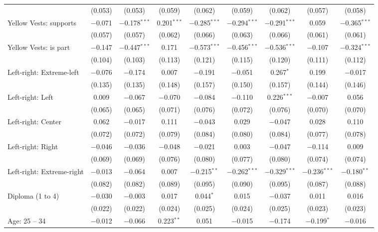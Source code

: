 \documentclass[11pt]{article}
\begin{document}
\begin{table}[!htbp]
{\begin{tabular}{@{\extracolsep{5pt}}lcccccccc}
  & (0.053) & (0.053) & (0.059) & (0.062) & (0.059) & (0.062) & (0.057) & (0.058) \\ 
  Yellow Vests: supports & $-$0.071 & $-$0.178$^{***}$ & 0.201$^{***}$ & $-$0.285$^{***}$ & $-$0.294$^{***}$ & $-$0.291$^{***}$ & 0.059 & $-$0.365$^{***}$ \\ 
  & (0.057) & (0.057) & (0.062) & (0.066) & (0.063) & (0.066) & (0.061) & (0.061) \\ 
  Yellow Vests: is part & $-$0.147 & $-$0.447$^{***}$ & 0.171 & $-$0.573$^{***}$ & $-$0.456$^{***}$ & $-$0.536$^{***}$ & $-$0.107 & $-$0.324$^{***}$ \\ 
  & (0.104) & (0.103) & (0.113) & (0.121) & (0.115) & (0.120) & (0.111) & (0.112) \\ 
  Left-right: Extreme-left & $-$0.076 & $-$0.174 & 0.007 & $-$0.191 & $-$0.051 & 0.267$^{*}$ & 0.199 & $-$0.017 \\ 
  & (0.135) & (0.135) & (0.148) & (0.157) & (0.150) & (0.157) & (0.144) & (0.146) \\ 
  Left-right: Left & 0.009 & $-$0.067 & $-$0.070 & $-$0.084 & $-$0.110 & 0.226$^{***}$ & $-$0.007 & 0.056 \\ 
  & (0.065) & (0.065) & (0.071) & (0.076) & (0.072) & (0.076) & (0.070) & (0.070) \\ 
  Left-right: Center & 0.062 & $-$0.017 & 0.111 & $-$0.043 & 0.029 & $-$0.047 & 0.028 & 0.110 \\ 
  & (0.072) & (0.072) & (0.079) & (0.084) & (0.080) & (0.084) & (0.077) & (0.078) \\ 
  Left-right: Right & $-$0.046 & $-$0.036 & $-$0.048 & $-$0.021 & 0.003 & $-$0.047 & $-$0.114 & 0.009 \\ 
  & (0.069) & (0.069) & (0.076) & (0.080) & (0.077) & (0.080) & (0.074) & (0.074) \\ 
  Left-right: Extreme-right & $-$0.013 & $-$0.064 & 0.007 & $-$0.215$^{**}$ & $-$0.262$^{***}$ & $-$0.329$^{***}$ & $-$0.236$^{***}$ & $-$0.180$^{**}$ \\ 
  & (0.082) & (0.082) & (0.089) & (0.095) & (0.090) & (0.095) & (0.087) & (0.088) \\ 
  Diploma (1 to 4) & $-$0.030 & $-$0.003 & 0.017 & 0.044$^{*}$ & 0.015 & $-$0.037 & 0.011 & 0.016 \\ 
  & (0.022) & (0.022) & (0.024) & (0.025) & (0.024) & (0.025) & (0.023) & (0.023) \\ 
  Age: 25 -- 34 & $-$0.012 & $-$0.066 & 0.223$^{**}$ & 0.051 & $-$0.015 & $-$0.174 & $-$0.199$^{*}$ & $-$0.016 \\ 

\end{tabular}}
\end{table}
\end{document}
